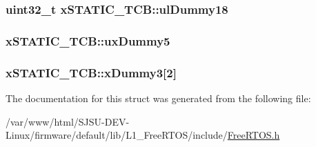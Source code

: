 \subsubsection[{\texorpdfstring{ul\+Dummy18}{ulDummy18}}]{\setlength{\rightskip}{0pt plus 5cm}uint32\+\_\+t x\+S\+T\+A\+T\+I\+C\+\_\+\+T\+C\+B\+::ul\+Dummy18}\hypertarget{structxSTATIC__TCB_ade6781276f913dcd592ee0f6cce76c7e}{}\label{structxSTATIC__TCB_ade6781276f913dcd592ee0f6cce76c7e}
\subsubsection[{\texorpdfstring{ux\+Dummy5}{uxDummy5}}]{ x\+S\+T\+A\+T\+I\+C\+\_\+\+T\+C\+B\+::ux\+Dummy5}\hypertarget{structxSTATIC__TCB_ab950bb498901ef7291e49086e5a2efd0}{}\label{structxSTATIC__TCB_ab950bb498901ef7291e49086e5a2efd0}
\subsubsection[{\texorpdfstring{x\+Dummy3}{xDummy3}}]{ x\+S\+T\+A\+T\+I\+C\+\_\+\+T\+C\+B\+::x\+Dummy3\mbox{[}2\mbox{]}}\hypertarget{structxSTATIC__TCB_a7f182aa8f5003494f63d975dabcb3ec1}{}\label{structxSTATIC__TCB_a7f182aa8f5003494f63d975dabcb3ec1}


The documentation for this struct was generated from the following file\+:\begin{DoxyCompactItemize}
\item 
/var/www/html/\+S\+J\+S\+U-\/\+D\+E\+V-\/\+Linux/firmware/default/lib/\+L1\+\_\+\+Free\+R\+T\+O\+S/include/\hyperlink{FreeRTOS_8h}{Free\+R\+T\+O\+S.\+h}\end{DoxyCompactItemize}
